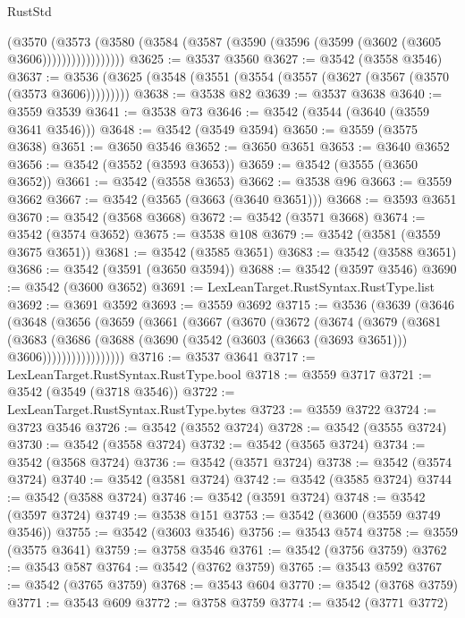 \begin{lexlean}{RustStd}
\begin{coremodule}
{\begin{coremodule}
{{{{{{{{{{{{{{{{{{{{{{{{{{{{{{{{{{{{{{{{{{{{{{{{{{                  (@3570
                    (@3573
                      (@3580 (@3584 (@3587 (@3590 (@3596 (@3599 (@3602 (@3605 @3606)))))))))))))))))
@3625 := @3537 @3560
@3627 := @3542 (@3558 @3546)
@3637 := @3536 (@3625 (@3548 (@3551 (@3554 (@3557 (@3627 (@3567 (@3570 (@3573 @3606)))))))))
@3638 := @3538 @82
@3639 := @3537 @3638
@3640 := @3559 @3539
@3641 := @3538 @73
@3646 := @3542 (@3544 (@3640 (@3559 @3641 @3546)))
@3648 := @3542 (@3549 @3594)
@3650 := @3559 (@3575 @3638)
@3651 := @3650 @3546
@3652 := @3650 @3651
@3653 := @3640 @3652
@3656 := @3542 (@3552 (@3593 @3653))
@3659 := @3542 (@3555 (@3650 @3652))
@3661 := @3542 (@3558 @3653)
@3662 := @3538 @96
@3663 := @3559 @3662
@3667 := @3542 (@3565 (@3663 (@3640 @3651)))
@3668 := @3593 @3651
@3670 := @3542 (@3568 @3668)
@3672 := @3542 (@3571 @3668)
@3674 := @3542 (@3574 @3652)
@3675 := @3538 @108
@3679 := @3542 (@3581 (@3559 @3675 @3651))
@3681 := @3542 (@3585 @3651)
@3683 := @3542 (@3588 @3651)
@3686 := @3542 (@3591 (@3650 @3594))
@3688 := @3542 (@3597 @3546)
@3690 := @3542 (@3600 @3652)
@3691 := LexLeanTarget.RustSyntax.RustType.list
@3692 := @3691 @3592
@3693 := @3559 @3692
@3715 := @3536
    (@3639
      (@3646
        (@3648
          (@3656
            (@3659
              (@3661
                (@3667
                  (@3670
                    (@3672
                      (@3674
                        (@3679
                          (@3681
                            (@3683
                              (@3686
                                (@3688
                                  (@3690 (@3542 (@3603 (@3663 (@3693 @3651))) @3606)))))))))))))))))
@3716 := @3537 @3641
@3717 := LexLeanTarget.RustSyntax.RustType.bool
@3718 := @3559 @3717
@3721 := @3542 (@3549 (@3718 @3546))
@3722 := LexLeanTarget.RustSyntax.RustType.bytes
@3723 := @3559 @3722
@3724 := @3723 @3546
@3726 := @3542 (@3552 @3724)
@3728 := @3542 (@3555 @3724)
@3730 := @3542 (@3558 @3724)
@3732 := @3542 (@3565 @3724)
@3734 := @3542 (@3568 @3724)
@3736 := @3542 (@3571 @3724)
@3738 := @3542 (@3574 @3724)
@3740 := @3542 (@3581 @3724)
@3742 := @3542 (@3585 @3724)
@3744 := @3542 (@3588 @3724)
@3746 := @3542 (@3591 @3724)
@3748 := @3542 (@3597 @3724)
@3749 := @3538 @151
@3753 := @3542 (@3600 (@3559 @3749 @3546))
@3755 := @3542 (@3603 @3546)
@3756 := @3543 @574
@3758 := @3559 (@3575 @3641)
@3759 := @3758 @3546
@3761 := @3542 (@3756 @3759)
@3762 := @3543 @587
@3764 := @3542 (@3762 @3759)
@3765 := @3543 @592
@3767 := @3542 (@3765 @3759)
@3768 := @3543 @604
@3770 := @3542 (@3768 @3759)
@3771 := @3543 @609
@3772 := @3758 @3759
@3774 := @3542 (@3771 @3772)
}}}}}}}}}}}}}}}}}}}}}}}}}}}}}}}}}}}}}}}}}}}}}}}}}}
\end{coremodule}}
\end{coremodule}
\end{lexlean}
